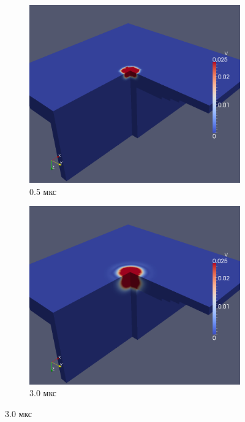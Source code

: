 \begin{figure}[htp]
\begin{subfigure}[b]{0.5\textwidth}
\centering
\includegraphics[width=\textwidth]{png/pkm-experiment/wing-stringer/wave-3d/v-0001.png}
\caption{0.5 мкс}
\end{subfigure}
\begin{subfigure}[b]{0.5\textwidth}
\centering
\includegraphics[width=\textwidth]{png/pkm-experiment/wing-stringer/wave-3d/v-0005.png}
\caption{3.0 мкс}
\end{subfigure}

\end{figure}
